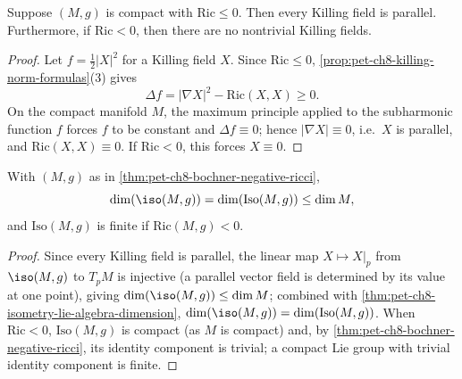 \begin{theorem}
  \label{thm:pet-ch8-bochner-negative-ricci}
  Suppose $(M,g)$ is compact with $\mathrm{Ric}\le0$. Then every Killing field
  is parallel. Furthermore, if $\mathrm{Ric}<0$, then there are no nontrivial
  Killing fields.
\end{theorem}
\begin{proof}
  Let $f=\tfrac12|X|^2$ for a Killing field $X$. Since $\mathrm{Ric}\le0$,
  \cref{prop:pet-ch8-killing-norm-formulas}(3) gives
  \[
    \Delta f=|\nabla X|^2-\mathrm{Ric}(X,X)\ge0.
  \]
  On the compact manifold $M$, the maximum principle applied to the
  subharmonic function $f$ forces $f$ to be constant and $\Delta f\equiv0$;
  hence $|\nabla X|\equiv0$, i.e.\ $X$ is parallel, and
  $\mathrm{Ric}(X,X)\equiv0$. If $\mathrm{Ric}<0$, this forces $X\equiv0$.
\end{proof}

\begin{corollary}[Corollary 8.2.3]
  \label{cor:pet-ch8-isometry-dimension-bound-negative-ricci}
  With $(M,g)$ as in \cref{thm:pet-ch8-bochner-negative-ricci},
  \[
    \dim(\iso(M,g))=\dim(\mathrm{Iso}(M,g))\le\dim M,
  \]
  and $\mathrm{Iso}(M,g)$ is finite if $\mathrm{Ric}(M,g)<0$.
\end{corollary}
\begin{proof}
  Since every Killing field is parallel, the linear map $X\mapsto X|_p$ from
  $\iso(M,g)$ to $T_pM$ is injective (a parallel vector field is determined by
  its value at one point), giving $\dim(\iso(M,g))\le\dim M$; combined with
  \cref{thm:pet-ch8-isometry-lie-algebra-dimension}, $\dim(\iso(M,g))=\dim(\mathrm{Iso}(M,g))$.
  When $\mathrm{Ric}<0$, $\mathrm{Iso}(M,g)$ is compact (as $M$ is compact) and,
  by \cref{thm:pet-ch8-bochner-negative-ricci}, its identity component is
  trivial; a compact Lie group with trivial identity component is finite.
\end{proof}

